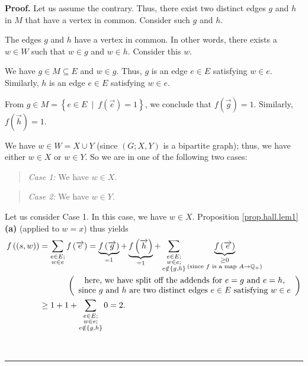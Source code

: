 \documentclass[numbers=enddot,12pt,final,onecolumn,notitlepage]{scrartcl}%
\theoremstyle{definition}
\newenvironment{statement}{\begin{quote}}{\end{quote}}
\newenvironment{proof}[1][Proof]{\noindent\textbf{#1.} }{\ \rule{0.5em}{0.5em}}
\let\sumnonlimits\sum
\renewcommand{\sum}{\sumnonlimits\limits}
\begin{document}
\begin{proof}
Let us assume the contrary. Thus, there exist two distinct edges $g$ and $h$
in $M$ that have a vertex in common. Consider such $g$ and $h$.

The edges $g$ and $h$ have a vertex in common. In other words, there exists a
$w\in W$ such that $w\in g$ and $w\in h$. Consider this $w$.

We have $g\in M\subseteq E$ and $w\in g$. Thus, $g$ is an edge $e\in E$
satisfying $w\in e$. Similarly, $h$ is an edge $e\in E$ satisfying $w\in e$.

From $g\in M=\left\{  e\in E\ \mid\ f\left(  \overrightarrow{e}\right)
=1\right\}  $, we conclude that $f\left(  \overrightarrow{g}\right)  =1$.
Similarly, $f\left(  \overrightarrow{h}\right)  =1$.

We have $w\in W=X\cup Y$ (since $\left(  G;X,Y\right)  $ is a bipartite
graph); thus, we have either $w\in X$ or $w\in Y$. So we are in one of the
following two cases:

\begin{statement}
\textit{Case 1:} We have $w\in X$.
\end{statement}

\begin{statement}
\textit{Case 2:} We have $w\in Y$.
\end{statement}

Let us consider Case 1. In this case, we have $w\in X$. Proposition
\ref{prop.hall.lem1} \textbf{(a)} (applied to $w=x$) thus yields%
\begin{align*}
f\left(  \left(  s,w\right)  \right)   &  =\sum_{\substack{e\in E;\\w\in
e}}f\left(  \overrightarrow{e}\right)  =\underbrace{f\left(
\overrightarrow{g}\right)  }_{=1}+\underbrace{f\left(  \overrightarrow{h}%
\right)  }_{=1}+\sum_{\substack{e\in E;\\w\in e;\\e\notin\left\{  g,h\right\}
}}\underbrace{f\left(  \overrightarrow{e}\right)  }_{\substack{\geq
0\\\text{(since }f\text{ is a map }A\rightarrow\mathbb{Q}_{+}\text{)}}}\\
&  \ \ \ \ \ \ \ \ \ \ \left(
\begin{array}
[c]{c}%
\text{here, we have split off the addends for }e=g\text{ and }e=h\text{,}\\
\text{since }g\text{ and }h\text{ are two distinct edges }e\in E\text{
satisfying }w\in e
\end{array}
\right) \\
&  \geq1+1+\sum_{\substack{e\in E;\\w\in e;\\e\notin\left\{  g,h\right\}
}}0=2.
\end{align*}



\end{proof}
\end{document}
